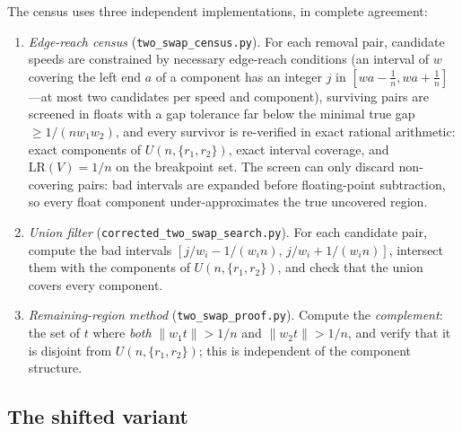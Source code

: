 \documentclass[11pt]{article}
\theoremstyle{definition}
\newcommand{\LR}{\mathrm{LR}}
\begin{document}
The census uses three independent implementations, in complete
agreement:
\begin{enumerate}
\item \emph{Edge-reach census} (\texttt{two\_swap\_census.py}).  For
  each removal pair, candidate speeds are constrained by necessary
  edge-reach conditions (an interval of $w$ covering the left end $a$
  of a component has an integer $j$ in $[wa-\frac1n,wa+\frac1n]$---at
  most two candidates per speed and component), surviving pairs are
  screened in floats with a gap tolerance far below the minimal true
  gap $\ge1/(nw_1w_2)$, and every survivor is re-verified in exact
  rational arithmetic: exact components of $U(n,\{r_1,r_2\})$, exact
  interval coverage, and $\LR(V)=1/n$ on the breakpoint set.  The
  screen can only discard non-covering pairs: bad intervals are
  expanded before floating-point subtraction, so every float component
  under-approximates the true uncovered region.
\item \emph{Union filter} (\texttt{corrected\_two\_swap\_search.py}).
  For each candidate pair, compute the bad intervals
  $[j/w_i-1/(w_i n),\,j/w_i+1/(w_i n)]$, intersect them with the
  components of $U(n,\{r_1,r_2\})$, and check that the union covers
  every component.
\item \emph{Remaining-region method}
  (\texttt{two\_swap\_proof.py}).  Compute the \emph{complement}: the
  set of $t$ where \emph{both} $\|w_1t\|>1/n$ and $\|w_2t\|>1/n$, and
  verify that it is disjoint from $U(n,\{r_1,r_2\})$; this is
  independent of the component structure.
\end{enumerate}

\subsection{The shifted variant}\label{sec:shifted}
\end{document}
